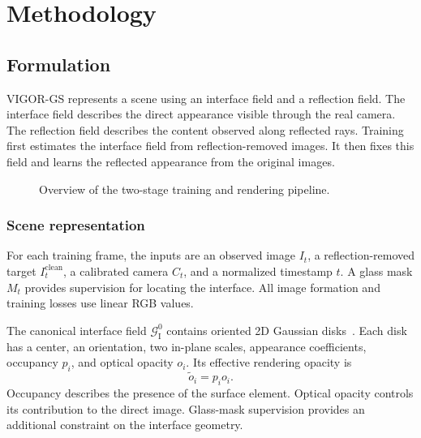\chapter{Methodology}
\section{Formulation}
\label{sec:formulation}

VIGOR-GS represents a scene using an interface field and a reflection field. The interface field describes the direct appearance visible through the real camera. The reflection field describes the content observed along reflected rays. Training first estimates the interface field from reflection-removed images. It then fixes this field and learns the reflected appearance from the original images.

\begin{figure}[!htbp]
  \centering
  \caption{Overview of the two-stage training and rendering pipeline.}
  \label{fig:vigor-pipeline}
\end{figure}

\subsection{Scene representation}
For each training frame, the inputs are an observed image $I_t$, a reflection-removed target $I_t^{\mathrm{clean}}$, a calibrated camera $C_t$, and a normalized timestamp $t$. A glass mask $M_t$ provides supervision for locating the interface. All image formation and training losses use linear RGB values.

The canonical interface field $\mathcal{G}_{\mathrm{I}}^0$ contains oriented 2D Gaussian disks~\cite{huang2024}. Each disk has a center, an orientation, two in-plane scales, appearance coefficients, occupancy $p_i$, and optical opacity $o_i$. Its effective rendering opacity is
\begin{equation}
  \widetilde{o}_i = p_i o_i.
  \label{eq:interface-opacity}
\end{equation}
Occupancy describes the presence of the surface element. Optical opacity controls its contribution to the direct image. Glass-mask supervision provides an additional constraint on the interface geometry.

